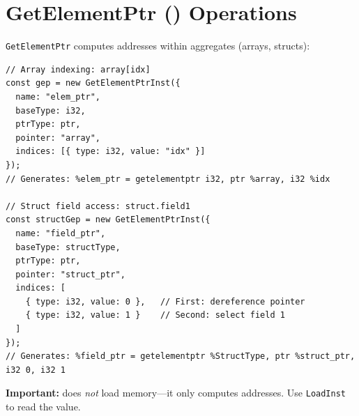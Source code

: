 \section{GetElementPtr () Operations}

\texttt{GetElementPtr} computes addresses within aggregates (arrays, structs):

\begin{lstlisting}[style=ts]
// Array indexing: array[idx]
const gep = new GetElementPtrInst({
  name: "elem_ptr",
  baseType: i32,
  ptrType: ptr,
  pointer: "array",
  indices: [{ type: i32, value: "idx" }]
});
// Generates: %elem_ptr = getelementptr i32, ptr %array, i32 %idx

// Struct field access: struct.field1
const structGep = new GetElementPtrInst({
  name: "field_ptr",
  baseType: structType,
  ptrType: ptr,
  pointer: "struct_ptr",
  indices: [
    { type: i32, value: 0 },   // First: dereference pointer
    { type: i32, value: 1 }    // Second: select field 1
  ]
});
// Generates: %field_ptr = getelementptr %StructType, ptr %struct_ptr, i32 0, i32 1
\end{lstlisting}

\textbf{Important:}  does \emph{not} load memory—it only computes addresses. Use \texttt{LoadInst} to read the value.

